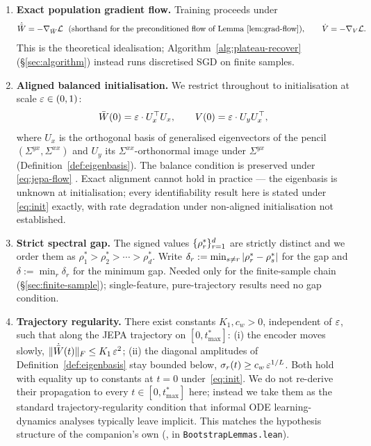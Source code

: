 \begin{enumerate}[label=(A\arabic*),ref=A\arabic*,leftmargin=2.5em,itemsep=4pt]

\item \label{ass:population-flow}
\textbf{Exact population gradient flow.} Training proceeds under
\begin{equation}
\label{eq:jepa-flow}
\dot{\bar{W}} = -\nabla_{\bar{W}} \mathcal{L}
\ \ \text{(shorthand for the preconditioned flow of Lemma~\ref{lem:grad-flow})},
\qquad
\dot{V} = -\nabla_{V} \mathcal{L}.
\end{equation}
This is the theoretical idealisation; Algorithm~\ref{alg:plateau-recover}
(\S\ref{sec:algorithm}) instead runs discretised SGD on finite samples.

\item \label{ass:aligned-init}
\textbf{Aligned balanced initialisation.} We restrict throughout to
initialisation at scale $\varepsilon\in(0,1)$:
\begin{equation}
\label{eq:init}
\bar W(0) = \varepsilon \cdot U_x^\top U_x,
\qquad
V(0) = \varepsilon \cdot U_y U_x^\top,
\end{equation}
where $U_x$ is the orthogonal basis of generalised eigenvectors of the
pencil $(\Sigma^{yx}, \Sigma^{xx})$ and $U_y$ its $\Sigma^{xx}$-orthonormal
image under $\Sigma^{yx}$ (Definition~\ref{def:eigenbasis}). The
balance condition is preserved under \eqref{eq:jepa-flow}
\citep{Saxe2014,Arora2018}. Exact alignment cannot hold in practice ---
the eigenbasis is unknown at initialisation; every identifiability result
here is stated under \eqref{eq:init} exactly, with rate degradation under
non-aligned initialisation not established.

\item \label{ass:gap}
\textbf{Strict spectral gap.} The signed values $\{\rho_r^*\}_{r=1}^d$
are strictly distinct and we order them as
$\rho_1^* > \rho_2^* > \cdots > \rho_d^*$. Write
$\delta_r := \min_{s \neq r}|\rho_r^* - \rho_s^*|$ for the gap and
$\delta := \min_r \delta_r$ for the minimum gap. Needed only for the
finite-sample chain (\S\ref{sec:finite-sample}); single-feature,
pure-trajectory results need no gap condition.

\item \label{ass:traj-reg}
\textbf{Trajectory regularity.} There exist constants $K_1, c_w > 0$,
independent of $\varepsilon$, such that along the JEPA trajectory on
$[0, t_{\max}^*]$: (i) the encoder moves slowly,
$\|\dot{\bar{W}}(t)\|_F \le K_1\,\varepsilon^2$; (ii) the diagonal amplitudes of
Definition~\ref{def:eigenbasis} stay bounded below,
$\sigma_r(t) \ge c_w\,\varepsilon^{1/L}$. Both hold with equality up to constants
at $t=0$ under~\eqref{eq:init}. We do not re-derive their propagation to
every $t \in [0, t_{\max}^*]$ here; instead we take them as the standard
trajectory-regularity condition that informal ODE learning-dynamics
analyses typically leave implicit. This matches the hypothesis
structure of the companion's own 
(,  in \texttt{BootstrapLemmas.lean}).

\end{enumerate}

